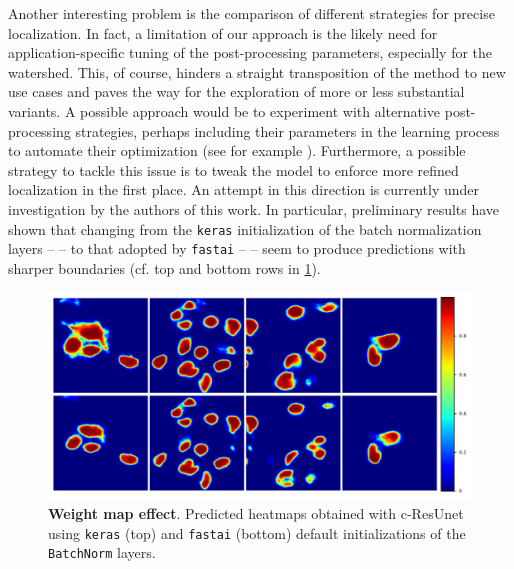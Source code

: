 Another interesting problem is the comparison of different strategies for precise localization. In fact, a limitation of our approach is the likely need for application-specific tuning of the post-processing parameters, especially for the watershed.
This, of course, hinders a straight transposition of the method to new use cases and paves the way for the exploration of more or less substantial variants.
A possible approach would be to experiment with alternative post-processing strategies, perhaps including their parameters in the learning process to automate their optimization (see for example \cite{wolf2017learned}).
Furthermore, a possible strategy to tackle this issue is to tweak the model to enforce more refined localization in the first place.
An attempt in this direction is currently under investigation by the authors of this work.
In particular, preliminary results have shown that changing from the \texttt{keras} initialization of the batch normalization layers --  -- to that adopted by \texttt{fastai} --  -- seem to produce predictions with sharper boundaries (cf. top and bottom rows in \cref{fig:kerasVSfastai_bathnorm}).
\begin{figure}
\centering
\includegraphics[width=\textwidth]{figures/610_future_works/Tc-ResUnetVSBbatchnorm_effect.pdf}
\caption{\textbf{Weight map effect}. 
Predicted heatmaps obtained with c-ResUnet using \texttt{keras} (top) and \texttt{fastai} (bottom) default initializations of the \texttt{BatchNorm} layers.} 
\label{fig:kerasVSfastai_bathnorm}
\end{figure}

